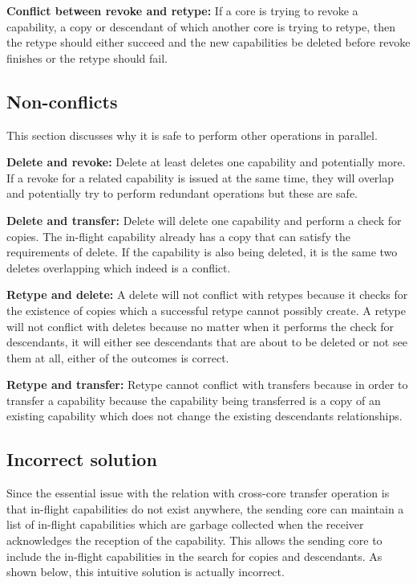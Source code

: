 \documentclass[a4paper,twoside]{report} %
\begin{document}
\textbf{Conflict between revoke and retype:} If a core is trying to
revoke a capability, a copy or descendant of which another core is
trying to retype, then the retype should either succeed and the new
capabilities be deleted before revoke finishes or the retype should
fail.

\subsection{Non-conflicts}
This section discusses why it is safe to perform other operations in
parallel.

\textbf{Delete and revoke:} Delete at least deletes one capability and
potentially more. If a revoke for a related capability is issued at
the same time, they will overlap and potentially try to perform
redundant operations but these are safe.

\textbf{Delete and transfer:} Delete will delete one capability and
perform a check for copies. The in-flight capability already has a
copy that can satisfy the requirements of delete. If the capability is
also being deleted, it is the same two deletes overlapping which
indeed is a conflict.

\textbf{Retype and delete:} A delete will not conflict with retypes
because it checks for the existence of copies which a successful
retype cannot possibly create. A retype will not conflict with deletes
because no matter when it performs the check for descendants, it will
either see descendants that are about to be deleted or not see them at
all, either of the outcomes is correct.

\textbf{Retype and transfer:} Retype cannot conflict with transfers
because in order to transfer a capability because the capability being
transferred is a copy of an existing capability which does not change
the existing descendants relationships.

\subsection{Incorrect solution}
Since the essential issue with the relation with cross-core transfer
operation is that in-flight capabilities do not exist anywhere, the
sending core can maintain a list of in-flight capabilities which are
garbage collected when the receiver acknowledges the reception of the
capability. This allows the sending core to include the in-flight
capabilities in the search for copies and descendants. As shown below,
this intuitive solution is actually incorrect.
\end{document}
